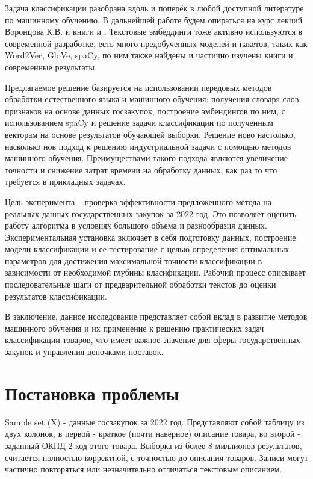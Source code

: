 \documentclass{article}
\begin{document}
Задача классификации разобрана вдоль и поперёк в любой доступной литературе по машинному обучению. В дальнейшей работе будем опираться на курс лекций Воронцова К.В. и книги \cite{Goodfellow2016DeepLearning} и \cite{Montani2019AdvancedNLP}. Текстовые эмбеддинги тоже активно используются в современной разработке, есть много предобученных моделей и пакетов, таких как Word2Vec, GloVe, spaCy, по ним также найдены и частично изучены книги и современные результаты. 

Предлагаемое решение базируется на использовании передовых методов обработки естественного языка и машинного обучения: получения словаря слов-признаков на основе данных госзакупок, построение эмбендингов по ним, с использованием spaCy и решение задачи классификации по полученным векторам на основе результатов обучающей выборки.
Решение ново настолько, насколько нов подход к решению индустриальной задачи с помощью методов машинного обучения. Преимуществами такого подхода являются увеличение точности и снижение затрат времени на обработку данных, как раз то что требуется в прикладных задачах.

Цель эксперимента – проверка эффективности предложенного метода на реальных данных государственных закупок за 2022 год. Это позволяет оценить работу алгоритма в условиях большого объема и разнообразия данных. Экспериментальная установка включает в себя подготовку данных, построение модели классификации и ее тестирование с целью определения оптимальных параметров для достижения максимальной точности классификации в зависимости от необходимой глубины класификации. Рабочий процесс описывает последовательные шаги от предварительной обработки текстов до оценки результатов классификации.

В заключение, данное исследование представляет собой вклад в развитие методов машинного обучения и их применение к решению практических задач классификации товаров, что имеет важное значение для сферы государственных закупок и управления цепочками поставок.

\section{Постановка проблемы}
Sample set (X) - данные госзакупок за 2022 год. Представляют собой таблицу из двух колонок, в первой - краткое (почти наверное) описание товара, во второй - заданный ОКПД 2 код этого товара. Выборка из более 8 миллионов результатов, считается полностью корректной, с точностью до описания товаров. Записи могут частично повторяться или незначительно отличаться текстовым описанием. 
\end{document}
